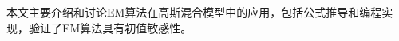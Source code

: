 
\begin{cnabstract}
\thispagestyle{empty}

本文主要介绍和讨论EM算法在高斯混合模型中的应用，包括公式推导和编程实现，验证了EM算法具有初值敏感性。


\end{cnabstract}
\par
\vspace*{2em}




